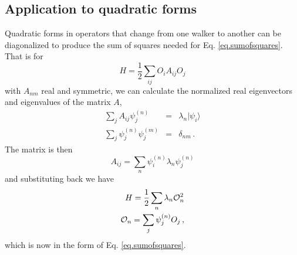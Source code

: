  \subsection{Application to quadratic forms}
 \label{sec.quad}
 Quadratic forms in operators that change from one walker to another
 can be diagonalized to produce the sum of squares needed for
 Eq. \ref{eq.sumofsquares}. That is for
 \begin{equation}
 H = \frac{1}{2} \sum_{ij} O_i A_{ij} O_j
 \end{equation}
 with $A_{nm}$ real and symmetric, we can calculate the normalized
 real eigenvectors and eigenvalues of the matrix $A$,
 \begin{eqnarray}
 \sum_j A_{ij} \psi_j^{(n)} &=& \lambda_n |\psi_i\rangle
 \nonumber\\
 \sum_j \psi_j^{(n)} \psi_j^{(m)} &=& \delta_{nm} \,.
 \end{eqnarray}
 The matrix is then
 \begin{equation}
 A_{ij} = \sum_n \psi_i^{(n)} \lambda_n\psi_j^{(n)}
 \end{equation}
 and substituting back we have
 \begin{eqnarray}
 H = \frac{1}{2} \sum_n \lambda_n {\cal O}_n^2
 \nonumber\\
 {\cal O}_n = \sum_j \psi_j^{(n)} O_j \,,
 \end{eqnarray}
 which is now in the form of Eq. \ref{eq.sumofsquares}.
 
